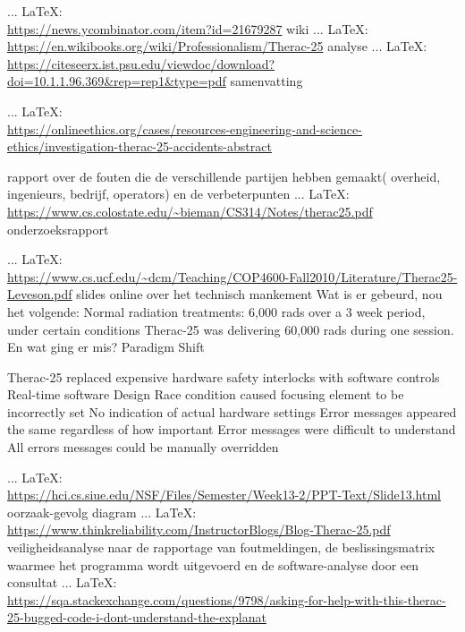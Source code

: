 \begin{thebibliography}{99}
{{{{ ... \LaTeX:\\ \url{https://news.ycombinator.com/item?id=21679287}
wiki
 ... \LaTeX:\\ \url{https://en.wikibooks.org/wiki/Professionalism/Therac-25}
analyse
 ... \LaTeX:\\ \url{https://citeseerx.ist.psu.edu/viewdoc/download?doi=10.1.1.96.369&rep=rep1&type=pdf}
samenvatting

 ... \LaTeX:\\ \url{https://onlineethics.org/cases/resources-engineering-and-science-ethics/investigation-therac-25-accidents-abstract}

rapport over de fouten die de verschillende partijen hebben gemaakt( overheid, ingenieurs, bedrijf, operators) en de verbeterpunten
 ... \LaTeX:\\ \url{https://www.cs.colostate.edu/~bieman/CS314/Notes/therac25.pdf}
\cite{}
onderzoeksrapport

 ... \LaTeX:\\ \url{https://www.cs.ucf.edu/~dcm/Teaching/COP4600-Fall2010/Literature/Therac25-Leveson.pdf}
\cite{}
slides online over het technisch mankement
Wat is er gebeurd, nou het volgende:
Normal radiation treatments: 6,000 rads over a 3 week period, under certain conditions Therac-25 was delivering 60,000 rads during one session.
En wat ging er mis?
Paradigm Shift

Therac-25 replaced expensive hardware safety interlocks with software controls
Real-time software
Design
Race condition caused focusing element to be incorrectly set
No indication of actual hardware settings
Error messages appeared the same regardless of how important
Error messages were difficult to understand
All errors messages could be manually overridden

 ... \LaTeX:\\ \url{https://hci.cs.siue.edu/NSF/Files/Semester/Week13-2/PPT-Text/Slide13.html}
\cite{}
oorzaak-gevolg diagram
 ... \LaTeX:\\ \url{https://www.thinkreliability.com/InstructorBlogs/Blog-Therac-25.pdf}
\cite{}
veiligheidsanalyse naar de rapportage van foutmeldingen, de beslissingsmatrix waarmee het programma wordt uitgevoerd en de software-analyse door een consultat
 ... \LaTeX:\\ \url{https://sqa.stackexchange.com/questions/9798/asking-for-help-with-this-therac-25-bugged-code-i-dont-understand-the-explanat}




}}}}
\end{thebibliography}
